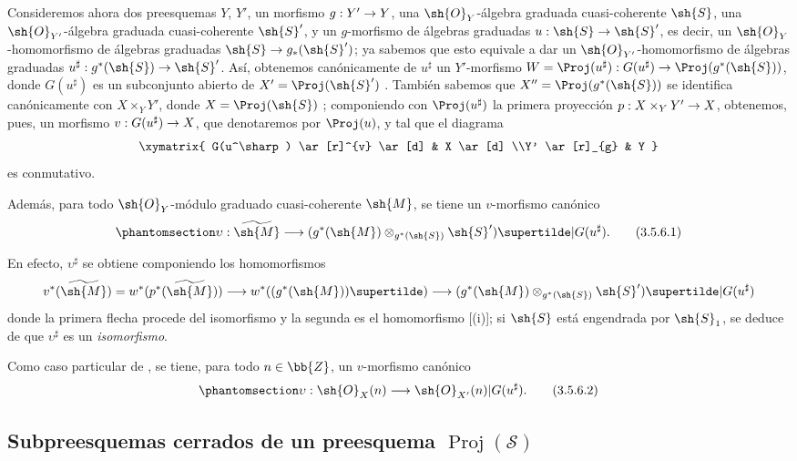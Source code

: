 \documentclass[oneside,10pt]{amsart}
\makeatletter
\newcommand{\ega@arrow}[2]{\mathchoice{#1}{#2}{#2}{#2}}
\renewcommand{\to}{\ega@arrow{\longrightarrow}{\rightarrow}}
\newcommand{\oldpage}[2][]{\marginnote{\normalfont\footnotesize\textbf{#1}~|~#2}\ignorespaces}
\let\EGAOriginalLabel\label
\renewcommand{\label}[1]{\phantomsection\EGAOriginalLabel{#1}}
\makeatother
\begin{document}
\begin{env}[3.5.6]
\label{II.3.5.6}
Consideremos ahora dos preesquemas $Y$, $Y'$, un morfismo $g:Y'\to Y$, una $\sh{O}_Y$-álgebra graduada cuasi-coherente $\sh{S}$, una $\sh{O}_{Y'}$-álgebra graduada cuasi-coherente $\sh{S}'$, y un $g$-morfismo de álgebras graduadas $u:\sh{S}\to\sh{S}'$, es decir, un $\sh{O}_Y$-homomorfismo de álgebras graduadas $\sh{S}\to g_*(\sh{S}')$; ya sabemos que esto equivale a dar un $\sh{O}_{Y'}$-homomorfismo de álgebras graduadas $u^\sharp:g^*(\sh{S})\to\sh{S}'$.
Así, obtenemos canónicamente de $u^\sharp$ un $Y'$-morfismo $W=\Proj(u^\sharp):G(u^\sharp)\to\Proj(g^*(\sh{S}))$, donde $G(u^\sharp)$ es un subconjunto abierto de $X'=\Proj(\sh{S}')$ .
También sabemos que $X''=\Proj(g^*(\sh{S}))$ se identifica canónicamente con $X\times_Y Y'$, donde $X=\Proj(\sh{S})$ ;
\oldpage[II]{64}
componiendo con $\Proj(u^\sharp)$ la primera proyección $p:X\times_Y Y'\to X$, obtenemos, pues, un morfismo $v:G(u^\sharp)\to X$, que denotaremos por $\Proj(u)$, y tal que el diagrama
\[
  \xymatrix{
    G(u^\sharp) \ar[r]^{v} \ar[d]
    & X \ar[d]
  \\Y' \ar[r]_{g}
    & Y
  }
\]
es conmutativo.

Además, para todo $\sh{O}_Y$-módulo graduado cuasi-coherente $\sh{M}$, se tiene un $v$-morfismo canónico
\[
\label{II.3.5.6.1}
  \upsilon:\widetilde{\sh{M}}\to(g^*(\sh{M})\otimes_{g^*(\sh{S})}\sh{S}')\supertilde|G(u^\sharp).
\tag{3.5.6.1}
\]

En efecto, $\upsilon^\sharp$ se obtiene componiendo los homomorfismos
\[
  v^*(\widetilde{\sh{M}})
  =w^*(p^*(\widetilde{\sh{M}}))
  \to w^*((g^*(\sh{M}))\supertilde)
  \to (g^*(\sh{M})\otimes_{g^*(\sh{S})}\sh{S}')\supertilde|G(u^\sharp)
\]
donde la primera flecha procede del isomorfismo  y la segunda es el homomorfismo [(i)]; si $\sh{S}$ está engendrada por $\sh{S}_1$, se deduce de  que $\upsilon^\sharp$ es un \emph{isomorfismo}.

Como caso particular de , se tiene, para todo $n\in\bb{Z}$, un $v$-morfismo canónico
\[
\label{II.3.5.6.2}
  \upsilon:\sh{O}_X(n)\to\sh{O}_{X'}(n)|G(u^\sharp).
\tag{3.5.6.2}
\]
\end{env}

\subsection{Subpreesquemas cerrados de un preesquema $\operatorname{Proj}(\mathcal{S})$}
\label{subsection:II.3.6}
\end{document}
